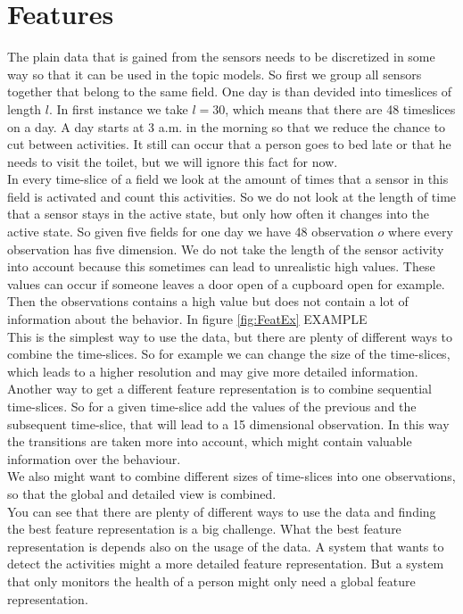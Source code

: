 \documentclass[11pt,a4paper]{article}
\begin{document}
\section{Features}
\label{sec:features}
The plain data that is gained from the sensors needs to be discretized in some way so that it can be used in the topic models. So first we group all sensors together that belong to the same field. One day is than devided into timeslices of length $l$. In first instance we take $l=30$, which means that there are 48 timeslices on a day. A day starts at 3 a.m. in the morning so that we reduce the chance to cut between activities. It still can occur that a person goes to bed late or that he needs to visit the toilet, but we will ignore this fact for now.\\
In every time-slice of a field we look at the amount of times that a sensor in this field is activated and count this activities. So we do not look at the length of time that a sensor stays in the active state, but only how often it changes into the active state. So given five fields for one day we have 48 observation $o$ where every observation has five dimension. We do not take the length of the sensor activity into account because this sometimes can lead to unrealistic high values. These values can occur if someone leaves a door open of a cupboard open for example. Then the observations contains a high value but does not contain a lot of information about the behavior. In figure \ref{fig:FeatEx} %
EXAMPLE\\
This is the simplest way to use the data, but there are plenty of different ways to combine the time-slices. So for example we can change the size of the time-slices, which leads to a higher resolution and may give more detailed information. Another way to get a different feature representation is to combine sequential time-slices. So for a given time-slice add the values of the previous and the subsequent time-slice, that will lead to a 15 dimensional observation. In this way the transitions are taken more into account, which might contain valuable information over the behaviour.\\
We also might want to combine different sizes of time-slices into one observations, so that the global and detailed view is combined.\\
You can see that there are plenty of different ways to use the data and finding the best feature representation is a big challenge. What the best feature representation is depends also on the usage of the data. A system that wants to detect the activities might a more detailed feature representation. But a system that only monitors the health of a person might only need a global feature representation.
\end{document}

